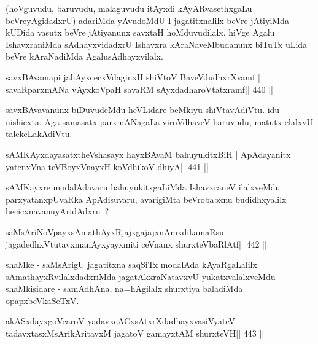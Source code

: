 \begin{artha}
(hoVguvudu, baruvudu, malaguvudu itAyxdi kAyARvasethxgaLu
beVreyAgidadxrU) adariMda yAvudoMdU I jagatitxnalilx beVre jAtiyiMda
kUDida vasutx beVre jAtiyanunx savxtaH hoMduvudilalx. hiVge Agalu
IshavxraniMda sAdhayxvidadxrU Ishavxra kAraNaveMbudanunx biTuTx
uLida beVre kAraNadiMda Agalu\break sAdhayxvilalx.
\end{artha}


\begin{shl}
savxBAvamapi ja{hAyx}cecxVdaginxH shiVtoV BaveVdudhxrXvamf |
savaRparxmANa vAyxkoVpaH savaRM sAyxdadharoVtatxramf\hfill || 440 ||
\end{shl}

\begin{artha}
savxBAvavanunx biDuvudeMdu heVLidare beMkiyu shiVtavAdiVtu. idu nishicxta, Aga samasatx parxmANagaLa viroVdhaveV baruvudu, matutx elalxvU talekeLakAdiVtu.
\end{artha}


\begin{shl}
sAMKAyxdayasatxtheVshasayx hayxBAvaM bahuyukitxBiH |
ApAdayanitx yatenxVna teVBoyxV\s nayxH koV\s dhikoV dhiyA\hfill || 441 ||
\end{shl}

\begin{artha}
sAMKayxre modalAdavaru bahuyukitxgaLiMda IshavxraneV ilalxveMdu
parxyatanxpUvaRka ApAdisuvaru, avarigiMta beVrobabxnu budidhxyalilx
hecicxnavanu\break yAridAdxru~?
\end{artha}


\begin{shl}
saMsAriNoV\s payxsAmathAyxRjajxgajajxnAmxdikamaRsu |
jagadedhxVtutavxmanAyxyayxmiti ceVnanx shurxteVbaRlAtf\hfill || 442 ||
\end{shl}

\begin{artha}
shaMke - saMsArigU jagatitxna saqSiTx modalAda kAyaRgaLalilx
sAmathayxRvilalxdadxriMda jagatAkxraNatavxvU yukatxvalalxveMdu
shaMkisidare - samAdhAna, na=hAgilalx shurxtiya baladiMda 
opapxbeVkaSeTxV.
\end{artha}

\begin{shl}
akASxdayxgoVcaroV yadavxcACxsAtxrXdadhayxvasiVyateV |
tadavxtasxMsArikAritavxM jagatoV gamayxtAM shurxteVH\hfill || 443 ||
\end{shl}


